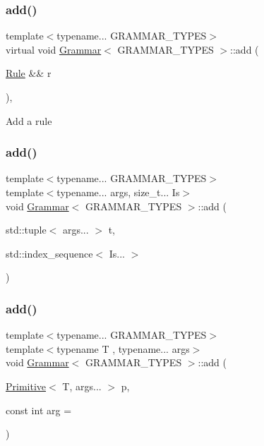 \subsubsection{\texorpdfstring{add()}{add()}\hspace{0.1cm}{\footnotesize\ttfamily [1/5]}}
{\footnotesize\ttfamily template$<$typename... G\+R\+A\+M\+M\+A\+R\+\_\+\+T\+Y\+P\+ES$>$ \\
virtual void \hyperlink{class_grammar}{Grammar}$<$ G\+R\+A\+M\+M\+A\+R\+\_\+\+T\+Y\+P\+ES $>$\+::add (\begin{DoxyParamCaption}\item[{\hyperlink{class_rule}{Rule} \&\&}]{r }\end{DoxyParamCaption})\hspace{0.3cm}{\ttfamily [inline]}, {\ttfamily [virtual]}}

Add a rule\mbox{\label{class_grammar_a3c4f41d4b1ff3c9973cb13ccea2c57fb}} 
\subsubsection{\texorpdfstring{add()}{add()}\hspace{0.1cm}{\footnotesize\ttfamily [2/5]}}
{\footnotesize\ttfamily template$<$typename... G\+R\+A\+M\+M\+A\+R\+\_\+\+T\+Y\+P\+ES$>$ \\
template$<$typename... args, size\+\_\+t... Is$>$ \\
void \hyperlink{class_grammar}{Grammar}$<$ G\+R\+A\+M\+M\+A\+R\+\_\+\+T\+Y\+P\+ES $>$\+::add (\begin{DoxyParamCaption}\item[{std\+::tuple$<$ args... $>$}]{t,  }\item[{std\+::index\+\_\+sequence$<$ Is... $>$}]{ }\end{DoxyParamCaption})\hspace{0.3cm}{\ttfamily [inline]}}

\mbox{\label{class_grammar_a86dfa9ce87af1779799e617bb3252220}} 
\subsubsection{\texorpdfstring{add()}{add()}\hspace{0.1cm}{\footnotesize\ttfamily [3/5]}}
{\footnotesize\ttfamily template$<$typename... G\+R\+A\+M\+M\+A\+R\+\_\+\+T\+Y\+P\+ES$>$ \\
template$<$typename T , typename... args$>$ \\
void \hyperlink{class_grammar}{Grammar}$<$ G\+R\+A\+M\+M\+A\+R\+\_\+\+T\+Y\+P\+ES $>$\+::add (\begin{DoxyParamCaption}\item[{\hyperlink{struct_primitive}{Primitive}$<$ T, args... $>$}]{p,  }\item[{const int}]{arg = {} }\end{DoxyParamCaption})\hspace{0.3cm}{\ttfamily [inline]}}

